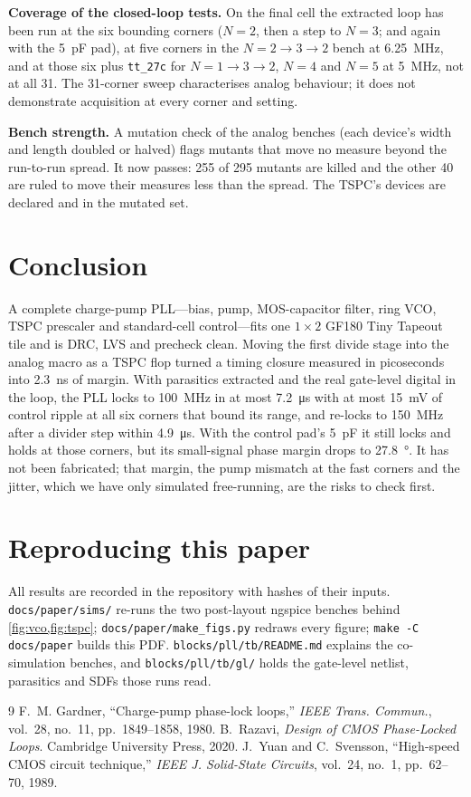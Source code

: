 \documentclass[10pt,twocolumn,letterpaper]{article}
\newcommand{\code}[1]{\texttt{\small #1}}
\begin{document}
\textbf{Coverage of the closed-loop tests.} On the final cell the extracted
loop has been run at the six bounding corners ($N=2$, then a step to
$N=3$; and again with the \SI{5}{pF} pad), at five corners in the
$N=2\to3\to2$ bench at \SI{6.25}{MHz}, and at those six plus \code{tt\_27c}
for $N=1\to3\to2$, $N=4$ and $N=5$ at \SI{5}{MHz}, not at all 31. The
31-corner sweep characterises analog behaviour; it does not demonstrate
acquisition at every corner and setting.

\textbf{Bench strength.} A mutation check of the analog benches (each
device's width and length doubled or halved) flags mutants that move no
measure beyond the run-to-run spread. It now passes: 255 of 295 mutants are
killed and the other 40 are ruled to move their measures less than the
spread. The TSPC's devices are declared and in the mutated set.

\section{Conclusion}
A complete charge-pump PLL---bias, pump, MOS-capacitor filter, ring VCO,
TSPC prescaler and standard-cell control---fits one $1\times2$ GF180 Tiny
Tapeout tile and is DRC, LVS and precheck clean. Moving the first divide
stage into the analog macro as a TSPC flop turned a timing closure measured
in picoseconds into \SI{2.3}{ns} of margin. With parasitics extracted and
the real gate-level digital in the loop, the PLL locks to \SI{100}{MHz} in
at most \SI{7.2}{\micro s} with at most \SI{15}{mV} of control ripple at
all six corners that bound its range, and re-locks to \SI{150}{MHz} after a
divider step within \SI{4.9}{\micro s}. With the control pad's
\SI{5}{pF} it still locks and holds at those corners, but its small-signal
phase margin drops to \SI{27.8}{\degree}. It has not been fabricated; that
margin, the pump mismatch at the fast corners and the jitter, which we have
only simulated free-running, are the risks to check first.

\section*{Reproducing this paper}
\small All results are recorded in the repository with hashes of their
inputs. \code{docs/paper/sims/} re-runs the two post-layout ngspice
benches behind \cref{fig:vco,fig:tspc}; \code{docs/paper/make\_figs.py}
redraws every figure; \code{make -C docs/paper} builds this PDF.
\code{blocks/pll/tb/README.md} explains the co-simulation benches, and
\code{blocks/pll/tb/gl/} holds the gate-level netlist, parasitics and SDFs
those runs read.

\begin{thebibliography}{9}\small
{} F.~M. Gardner, ``Charge-pump phase-lock loops,''
\emph{IEEE Trans. Commun.}, vol.~28, no.~11, pp.~1849--1858, 1980.
 B.~Razavi, \emph{Design of CMOS Phase-Locked Loops}.
Cambridge University Press, 2020.
 J.~Yuan and C.~Svensson, ``High-speed CMOS circuit technique,''
\emph{IEEE J. Solid-State Circuits}, vol.~24, no.~1, pp.~62--70, 1989.
\end{thebibliography}
\end{document}
